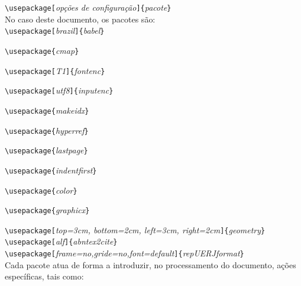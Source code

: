 \documentclass[a4paper,12pt,oneside,onecolumn]{article}
\newcommand{\comando}[1]{\texttt{\textbackslash #1}}
\newcommand{\opcoes}[1]{\texttt{[}\textsl{#1}\texttt{]}}
\newcommand{\param}[1]{\texttt{\{}\textsl{#1}\texttt{\}}}
\begin{document}
\comando{usepackage}\opcoes{opções de configuração}\param{pacote}\\

No caso deste documento, os pacotes são:\\

\comando{usepackage}\opcoes{brazil}\param{babel}  %

\comando{usepackage}\param{cmap}                %

\comando{usepackage}\opcoes{T1}\param{fontenc}    %

\comando{usepackage}\opcoes{utf8}\param{inputenc} %

\comando{usepackage}\param{makeidx}        %

\comando{usepackage}\param{hyperref}       %

\comando{usepackage}\param{lastpage}       %

\comando{usepackage}\param{indentfirst}    %

\comando{usepackage}\param{color}          %

\comando{usepackage}\param{graphicx}       %

\comando{usepackage}\opcoes{top=3cm, bottom=2cm, left=3cm, right=2cm}\param{geometry}\\

\comando{usepackage}\opcoes{alf}\param{abntex2cite}\\

\comando{usepackage}\opcoes{frame=no,gride=no,font=default}\param{repUERJformat}\\

Cada pacote atua de forma a introduzir, no processamento do documento, ações específicas, tais como:
\end{document}
